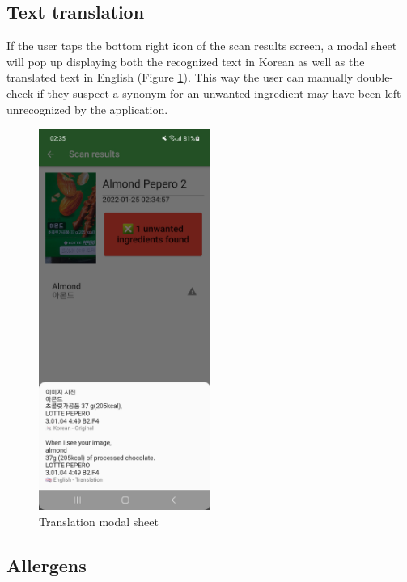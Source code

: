 \clearpage

\subsection{Text translation}

If the user taps the bottom right icon of the scan results screen, a modal sheet will pop up displaying both the recognized text in Korean as well as the translated text in English (Figure \ref{fig:translate}). This way the user can manually double-check if they suspect a synonym for an unwanted ingredient may have been left unrecognized by the application.

\begin{figure}[h]
  \centering
  \includegraphics[width=0.5\textwidth]{Figures/Screenshot/papago.jpg}
  \caption{%
    Translation modal sheet
  }
  \label{fig:translate}
\end{figure}

\clearpage

\subsection{Allergens}

